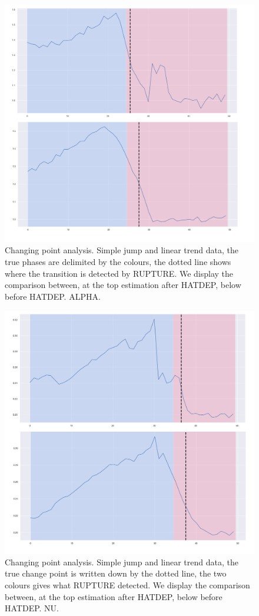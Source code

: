 \begin{figure}
\centering
\includegraphics[width = 0.90 \textwidth]{../imag/chap4/Figure_22.png}
\caption{Changing point analysis. Simple jump and linear trend data, the true phases are delimited by the colours, the dotted line shows where the transition is detected by RUPTURE. We display the comparison between, at the top estimation after HATDEP, below before HATDEP. ALPHA.}
\label{fig:changing_point_22}
\end{figure}



\begin{figure}
\centering
\includegraphics[width = 0.90 \textwidth]{../imag/chap4/Figure_42.png}
\caption{Changing point analysis. Simple jump and linear trend data, the true change point is written down by the dotted line, the two colours gives what RUPTURE detected. We display the comparison between, at the top estimation after HATDEP, below before HATDEP. NU.}
\label{fig:changing_point_42}
\end{figure}


